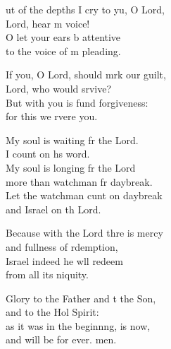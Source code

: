 \settowidth{\versewidth}{Out of the depths I cry to you, O Lord, *}
\begin{psalmverse}%
  \begin{patverse}
ut of the depths I cry to yu, O Lord,\Med\\
    Lord, hear m voice!\\
O let your ears b attentive\Med\\
    to the voice of m pleading.

If you, O Lord, should mrk our guilt,\Med\\
    Lord, who would srvive?\\
But with you is fund forgiveness:\Med\\
    for this we rvere you.

My soul is waiting fr the Lord.\Med\\
    I count on h\pointup{\i}s word.\\
My soul is longing fr the Lord\Med\\
    more than watchman fr daybreak.\\
Let the watchman cunt on daybreak\Med\\
    and Israel on th Lord.

Because with the Lord thre is mercy\Med\\
    and fullness of rdemption,\\
Israel indeed he w\pointup{\i}ll redeem\Med\\
    from all its \pointup{\i}niquity.

Glory to the Father and t the Son,\Med\\
    and to the Hol Spirit:\\
as it was in the beginn\pointup{\i}ng, is now,\Med\\
    and will be for ever. men.
  \end{patverse}
\end{psalmverse}
